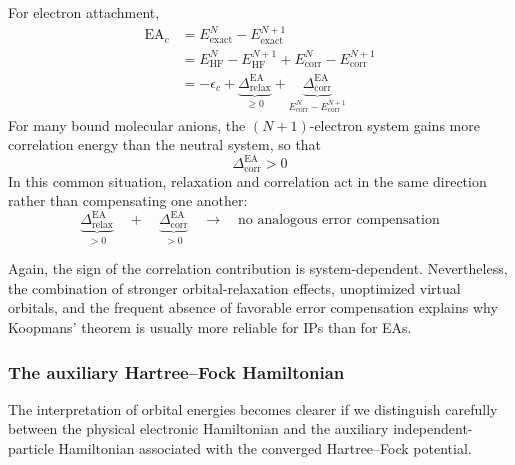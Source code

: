 \documentclass[11pt,a4paper,titlepage]{article}
\numberwithin{equation}{section}
\begin{document}
For electron attachment,
\begin{equation}
\begin{split}
  \text{EA}_c
  &=
  E_\text{exact}^{N}
  -
  E_\text{exact}^{N+1}
  \\
  &=
  E_\text{HF}^{N}
  -
  E_\text{HF}^{N+1}
  +
  E_\text{corr}^{N}
  -
  E_\text{corr}^{N+1}
  \\
  &=\boxed{
  -\epsilon_c
  +
  \underbrace{
    \Delta_\text{relax}^\text{EA}
  }_{\geq0}
  +
  \underbrace{
    \Delta_\text{corr}^\text{EA}
  }_{
    E_\text{corr}^{N}-E_\text{corr}^{N+1}
  }
  }
  \label{eq:koopmans-ea-corrections}
\end{split}
\end{equation}
For many bound molecular anions, the $(N+1)$-electron system gains more
correlation energy than the neutral system, so that
\begin{equation}
  \Delta_\text{corr}^\text{EA}>0
\end{equation}
In this common situation, relaxation and correlation act in the same
direction rather than compensating one another:
\begin{equation}
  \underbrace{\Delta_\text{relax}^\text{EA}}_{>0}
  \quad+\quad
  \underbrace{\Delta_\text{corr}^\text{EA}}_{>0}
  \quad\longrightarrow\quad
  \text{no analogous error compensation}
\end{equation}

Again, the sign of the correlation contribution is system-dependent.
Nevertheless, the combination of stronger orbital-relaxation effects,
unoptimized virtual orbitals, and the frequent absence of favorable error
compensation explains why Koopmans' theorem is usually more reliable
for IPs than for EAs.


\subsubsection{The auxiliary Hartree--Fock Hamiltonian}

The interpretation of orbital energies becomes clearer if we distinguish
carefully between the physical electronic Hamiltonian and the auxiliary
independent-particle Hamiltonian associated with the converged Hartree--Fock
potential.
\end{document}
